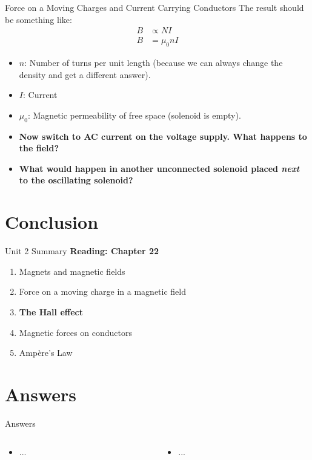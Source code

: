\documentclass{beamer}
\begin{document}
\begin{frame}{Force on a Moving Charges and Current Carrying Conductors}
The result should be something like:
\begin{align}
B &\propto N I \\
B &= \mu_0 n I
\end{align}
\begin{itemize}
\item $n$: Number of turns per unit length (because we can always change the density and get a different answer).
\item $I$: Current
\item $\mu_0$: Magnetic permeability of free space (solenoid is empty).
\item \textbf{Now switch to AC current on the voltage supply.  What happens to the field?}
\item \textbf{What would happen in another unconnected solenoid placed \textit{next} to the oscillating solenoid?}
\end{itemize}
\end{frame}

\section{Conclusion}

\begin{frame}{Unit 2 Summary}
\textbf{Reading: Chapter 22}
\begin{enumerate}
\item Magnets and magnetic fields
\item Force on a moving charge in a magnetic field
\item \textbf{The Hall effect}
\item Magnetic forces on conductors
\item \alert{Amp\`{e}re's Law}
\end{enumerate}
\end{frame}

\section{Answers}

\begin{frame}{Answers}
\tiny
\begin{columns}[T]
\begin{column}{0.5\textwidth}
\begin{itemize}
\item ...
\end{itemize}
\end{column}
\begin{column}{0.5\textwidth}
\begin{itemize}
\item ...
\end{itemize}
\end{column}
\end{columns}
\end{frame}
\end{document}
